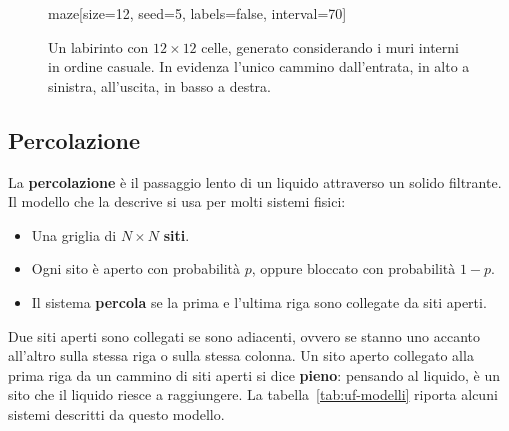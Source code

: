 \begin{figure}[htbp]
\begin{widget}{maze}[size=12, seed=5, labels=false, interval=70]
\end{widget}
\caption{Un labirinto con $12 \times 12$ celle, generato considerando i muri interni in ordine casuale. In evidenza l'unico cammino dall'entrata, in alto a sinistra, all'uscita, in basso a destra.}
\label{fig:uf-labirinto-grande}
\end{figure}

\subsection{Percolazione}\label{sec:uf-percolazione}
La \textbf{percolazione} è il passaggio lento di un liquido attraverso un solido filtrante. Il modello che la descrive si usa per molti sistemi fisici:
\begin{itemize}
    \item Una griglia di $N \times N$ \textbf{siti}.
    \item Ogni sito è aperto con probabilità $p$, oppure bloccato con probabilità $1 - p$.
    \item Il sistema \textbf{percola} se la prima e l'ultima riga sono collegate da siti aperti.
\end{itemize}

Due siti aperti sono collegati se sono adiacenti, ovvero se stanno uno accanto all'altro sulla stessa riga o sulla stessa colonna. Un sito aperto collegato alla prima riga da un cammino di siti aperti si dice \textbf{pieno}: pensando al liquido, è un sito che il liquido riesce a raggiungere. La tabella~\ref{tab:uf-modelli} riporta alcuni sistemi descritti da questo modello.

